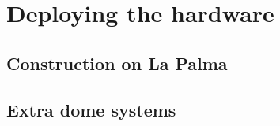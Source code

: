 \section{Deploying the hardware}
\label{sec:deployment}
\begin{colsection}


\begin{colsection}


\end{colsection}


\subsection{Construction on La Palma}
\label{sec:construction}
\begin{colsection}


\end{colsection}


\subsection{Extra dome systems}
\label{sec:arduino}
\begin{colsection}


\end{colsection}


\end{colsection}


\newpage
